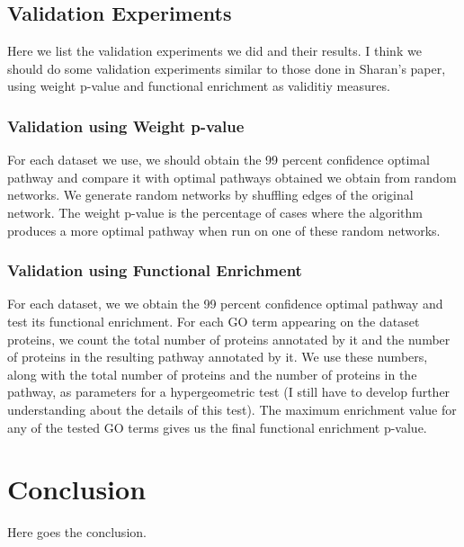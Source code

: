\documentclass{ws-procs11x85}
\begin{document}
\subsection{Validation Experiments}
Here we list the validation experiments we did and their results. I think we
should do some validation experiments similar to those done in Sharan's paper,
using weight p-value and functional enrichment as validitiy measures.

\subsubsection{Validation using Weight p-value}
For each dataset we use, we should obtain the 99 percent confidence optimal
pathway and compare it with optimal pathways obtained we obtain from random
networks. We generate random networks by shuffling edges of the original
network. The weight p-value is the percentage of cases where the algorithm
produces a more optimal pathway when run on one of these random networks.

\subsubsection{Validation using Functional Enrichment}
 For each dataset, we we obtain the 99 percent confidence optimal pathway and
 test its functional enrichment. For each GO term appearing on the dataset
 proteins, we count the total number of proteins annotated by it and the
 number of proteins in the resulting pathway annotated by it. We use these
 numbers, along with the total number of proteins and the number of proteins in
 the pathway, as parameters for a hypergeometric test (I still have to develop
 further understanding about the details of this test). The maximum enrichment
 value for any of the tested GO terms gives us the final functional enrichment
 p-value.


\section{Conclusion}
Here goes the conclusion.




\end{document}
